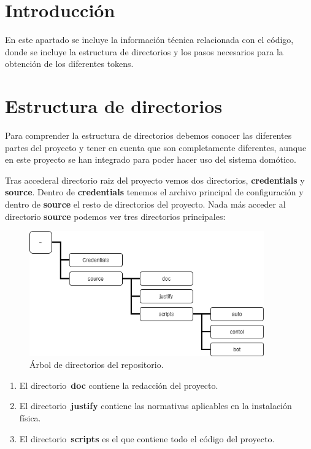 
\section{Introducción}
En este apartado se incluye la información técnica relacionada con el código, donde se incluye la estructura de directorios y los pasos necesarios para la obtención de los diferentes tokens.

\section{Estructura de directorios}
Para comprender la estructura de directorios debemos conocer las diferentes partes del proyecto y tener en cuenta que son completamente diferentes, aunque en este proyecto se han integrado para poder hacer uso del sistema domótico. 

Tras accederal directorio raiz del proyecto vemos dos directorios, \textbf{credentials} y \textbf{source}. Dentro de \textbf{credentials} tenemos el archivo principal de configuración y dentro de \textbf{source} el resto de directorios del proyecto. Nada más acceder al directorio \textbf{source} podemos ver tres directorios principales:

\begin{figure}[h]
\centering
\includegraphics[width=0.9\textwidth]{img/Diagramas/directorios1.png}
\caption{Árbol de directorios del repositorio.}\label{Directorios}
\end{figure}

\begin{enumerate}
    \item El directorio~\textbf{doc} contiene la redacción del proyecto.
    \item El directorio~\textbf{justify} contiene las normativas aplicables en la instalación física.
    \item El directorio~\textbf{scripts} es el que contiene todo el código del proyecto.
\end{enumerate}

